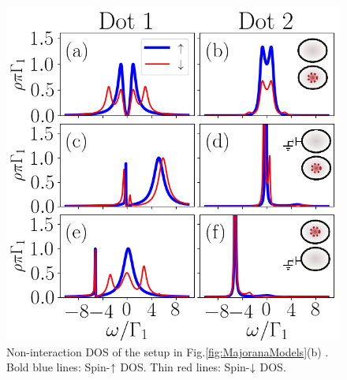 \documentclass[showpacs,aps,prb,reprint,superscriptaddress]{revtex4-1}
\begin{document}
\begin{figure}[bt]
\begin{center}
\includegraphics[scale=0.48]{Graficos/t1>0.png}
\caption{  \label{fig:t1>0} Non-interaction DOS of the setup in Fig.\ref{fig:MajoranaModels}(b) . Bold blue lines: Spin-$\uparrow$ DOS. Thin red lines: Spin-$\downarrow$ DOS.
}
%
\end{center}
\end{figure}


 
\end{document}
